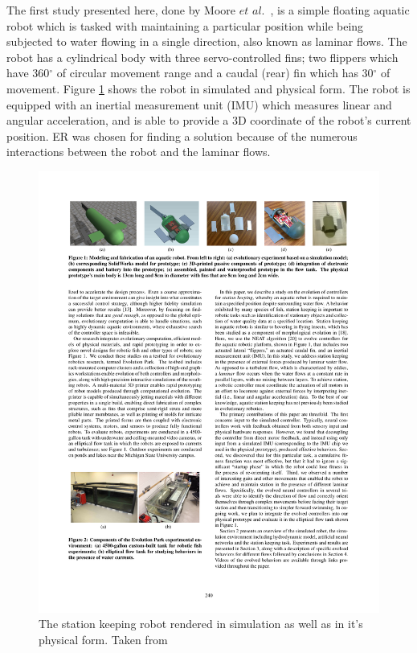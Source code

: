\documentclass{sig-alternate}
\begin{document}
	The first study presented here, done by Moore $et$ $al.$~\cite{Moore:2013:ESK:2463372.2463402}, is a simple floating aquatic robot which is tasked with maintaining a particular position while being subjected to water flowing in a single direction, also known as laminar flows. The robot has a cylindrical body with three servo-controlled fins; two flippers which have 360$^\circ$ of circular movement range and a caudal (rear) fin which has 30$^\circ$ of movement. Figure \ref{fig:sRobot} shows the robot in simulated and physical form. The robot is equipped with an inertial measurement unit (IMU) which measures linear and angular acceleration, and is able to provide a 3D coordinate of the robot's current position. ER was chosen for finding a solution because of the numerous interactions between the robot and the laminar flows.

\begin{figure}%
\center
  \includegraphics[scale=.8]{sr2}
\caption{The station keeping robot rendered in simulation as well as in it's physical form. Taken from \cite{Moore:2013:ESK:2463372.2463402}}
\label{fig:sRobot}
\end{figure}
\end{document}
